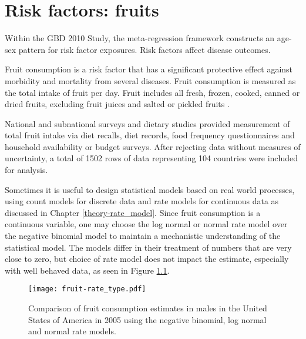 \chapter{Risk factors: fruits}
\label{applications-log_normal}

Within the GBD 2010 Study, the meta-regression framework constructs an age-sex pattern for risk factor exposures.  Risk factors affect disease outcomes.

Fruit consumption is a risk factor that has a significant protective effect against morbidity and mortality from several diseases.  Fruit consumption is measured as the total intake of fruit per day.  Fruit includes all fresh, frozen, cooked, canned or dried fruits, excluding fruit juices and salted or pickled fruits \cite{he_increased_2007, boeing_intake_2006}.

National and subnational surveys and dietary studies provided measurement of total fruit intake via diet recalls, diet records, food frequency questionnaires and household availability or budget surveys.  After rejecting data without measures of uncertainty, a total of 1502 rows of data representing 104 countries were included for analysis.

Sometimes it is useful to design statistical models based on real world processes, using count models for discrete data and rate models for continuous data as discussed in Chapter \ref{theory-rate_model}.  Since fruit consumption is a continuous variable, one may choose the log normal or normal rate model over the negative binomial model to maintain a mechanistic understanding of the statistical model.  The models differ in their treatment of numbers that are very close to zero, but choice of rate model does not impact the estimate, especially with well behaved data, as seen in Figure \ref{fig:app-fruit rate type}.

    \begin{figure}[h]
        \begin{center}
            \texttt{[image: fruit-rate\_type.pdf]}
            \caption{Comparison of fruit consumption estimates in males in the United States of America in 2005 using the negative binomial, log normal and normal rate models.}
            \label{fig:app-fruit rate type}
        \end{center}
    \end{figure} 